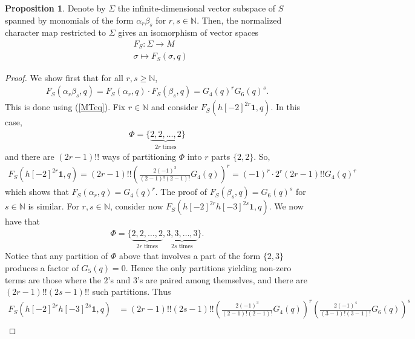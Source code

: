 \documentclass[10pt,a4paper]{amsart}
\numberwithin{equation}{section}
\theoremstyle{definition}
\newtheorem{Prop}[Th]{Proposition}
\newcommand{\Heis}{S}
\begin{document}
\begin{Prop}\label{Prop: charactermultiplicative}
    Denote by $\Sigma$ the infinite-dimensional vector subspace of $\Heis$ spanned by monomials of the form $\alpha_{r}\beta_{s}$ for $r,s \in \mathbb{N}$. Then, the normalized character map restricted to $\Sigma$ gives an isomorphism of vector spaces
    \begin{align*}
        &F_{\Heis}: \Sigma \to M \\
        &\sigma \mapsto F_{\Heis}(\sigma,q)
    \end{align*}
\end{Prop}
\begin{proof}
    We show first that for all $r,s \geq \mathbb{N}$,
    \begin{align}
        F_{\Heis}(\alpha_{r} \beta_{s},q) = F_{\Heis}(\alpha_{r},q) \cdot F_{\Heis}(\beta_{s},q) = G_{4}(q)^{r} G_{6}(q)^{s}. \label{charactermultiplicativeeq1}
    \end{align}
    This is done using (\ref{MTeq}). Fix $r \in \mathbb{N}$ and consider $F_{\Heis}(h[-2]^{2r}\textbf{1},q)$. In this case, 
    \begin{align*}
        \Phi = \lbrace\underbrace{ 2,2, \ldots, 2 }_{\text{$2r$ times}}\rbrace
    \end{align*}
    and there are $(2r-1)!!$ ways of partitioning $\Phi$ into $r$ parts $\lbrace 2,2 \rbrace$. So,
    \begin{align*}
        F_{\Heis}(h[-2]^{2r}\textbf{1},q) = (2r-1)!! \left( \frac{2(-1)^{3}}{(2-1)!(2-1)!} G_{4}(q) \right)^{r} = (-1)^{r} \cdot 2^{r} (2r-1)!! G_{4}(q)^{r}
    \end{align*}
    which shows that $F_{\Heis}(\alpha_{r},q) = G_{4}(q)^{r}$. The proof of $F_{\Heis}(\beta_{s},q) = G_{6}(q)^{s}$ for $s \in \mathbb{N}$ is similar. For $r,s \in \mathbb{N}$, consider now $F_{\Heis}(h[-2]^{2r}h[-3]^{2s}\textbf{1},q)$. We now have that
    \begin{align*}
        \Phi = \lbrace \underbrace{2,2, \ldots ,2}_{\text{$2r$ times}}, \underbrace{3,3, \ldots ,3}_{\text{$2s$ times}} \rbrace.
    \end{align*}
    Notice that any partition of $\Phi$ above that involves a part of the form $\lbrace 2,3 \rbrace$ produces a factor of $G_{5}(q)=0$. Hence the only partitions yielding non-zero terms are those where the $2$'s and $3$'s are paired among themselves, and there are $(2r-1)!!(2s-1)!!$ such partitions. Thus
    \begin{align*}
        F_{\Heis}(h[-2]^{2r}h[-3]^{2s}\textbf{1},q) &= (2r-1)!!(2s-1)!! \left( \frac{2(-1)^{3}}{(2-1)!(2-1)!} G_{4}(q) \right)^{r} \left( \frac{2(-1)^{4}}{(3-1)!(3-1)!} G_{6}(q) \right)^{s} \\

\end{align*}
\end{proof}
\end{document}
